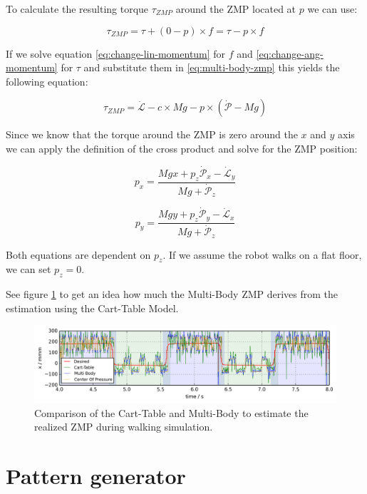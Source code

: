 \documentclass[english,ngerman]{KITreprt}
\begin{document}
To calculate the resulting torque $\tau_{ZMP}$ around the ZMP located at
$p$ we can use:

\begin{equation} \label{eq:multi-body-zmp}
\tau_{ZMP} = \tau + (0 - p) \times f = \tau - p \times f
\end{equation}

If we solve equation \ref{eq:change-lin-momentum} for $f$ and
\ref{eq:change-ang-momentum} for $\tau$ and substitute them in
\ref{eq:multi-body-zmp} this yields the following equation:

\begin{equation}
\tau_{ZMP} = \dot{\mathcal{L}} - c \times M g - p \times (\dot{\mathcal{P}} - Mg)
\end{equation}

Since we know that the torque around the ZMP is zero around the $x$ and
$y$ axis we can apply the definition of the cross product and solve for
the ZMP position:

\begin{equation}
p_x = \frac{Mgx + p_z \dot{\mathcal{P}}_x - \dot{\mathcal{L}}_y}{Mg + \dot{\mathcal{P}}_z}
\end{equation}

\begin{equation}
p_y = \frac{Mgy + p_z \dot{\mathcal{P}}_y - \dot{\mathcal{L}}_x}{Mg + \dot{\mathcal{P}}_z}
\end{equation}

Both equations are dependent on $p_z$. If we assume the robot walks on a
flat floor, we can set $p_z = 0$.

See figure \ref{img:zmp-comparison} to get an idea how much the
Multi-Body ZMP derives from the estimation using the Cart-Table Model.

\begin{figure}[tb]
\includegraphics[width=\textwidth,resolution=300]{images/zmp_comparison.png}
\caption{Comparison of the Cart-Table and Multi-Body to estimate the realized ZMP during walking simulation.}
\label{img:zmp-comparison}
\end{figure}

\chapter{Pattern generator}\label{chapter:pattern-generator}
\end{document}
